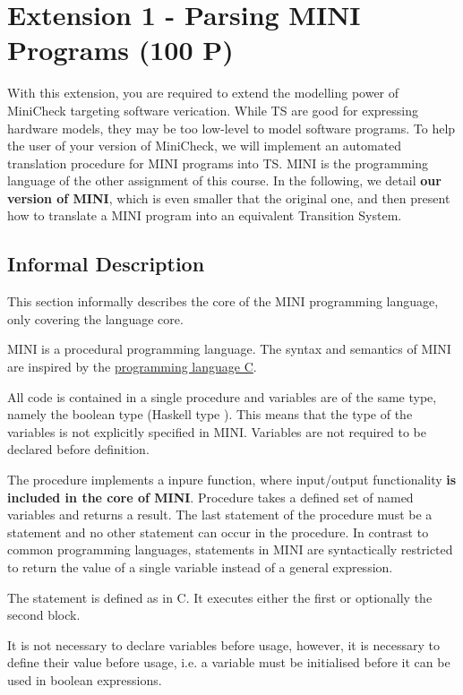 \documentclass{article}
\begin{document}
\section{Extension 1 - Parsing MINI Programs (100 P)}
\label{sec:ext1}
With this extension, you are required to extend the modelling power of MiniCheck targeting 
software verication. While TS are good for expressing hardware models, they may be too low-level 
to model software programs. To help the user of your version of MiniCheck, we will implement an 
automated translation procedure for MINI programs into TS. MINI is the programming language of the other assignment of this course. In the following, we detail \textbf{our version of MINI}, which is even smaller that the original one, and then present how to translate a MINI program into an equivalent Transition System.

\subsection{Informal Description}
This section informally describes the core of the MINI programming language, only covering the language core.

MINI is a procedural programming language. The syntax and semantics of MINI are inspired by the \href{https://en.wikipedia.org/wiki/C_(programming_language)}{programming language C}.

All code is contained in a single procedure  and variables are of the same type, namely the boolean type (Haskell type ). This means that the type of the variables is not explicitly specified in MINI. Variables are not required to be declared before definition.

The procedure  implements a inpure function, where input/output functionality \textbf{is  included in the core of MINI}. Procedure  takes a defined set of named variables and returns a result. The last statement of the procedure must be a  statement and no other  statement can occur in the procedure. In contrast to common programming languages,  statements in MINI are syntactically restricted to return the value of a single variable instead of a general expression.

The  statement is defined as in C. It executes either the first or optionally the second block.

It is not necessary to declare variables before usage, however, it is necessary to define their value before usage, i.e. a variable must be initialised before it can be used in boolean expressions.
\end{document}
